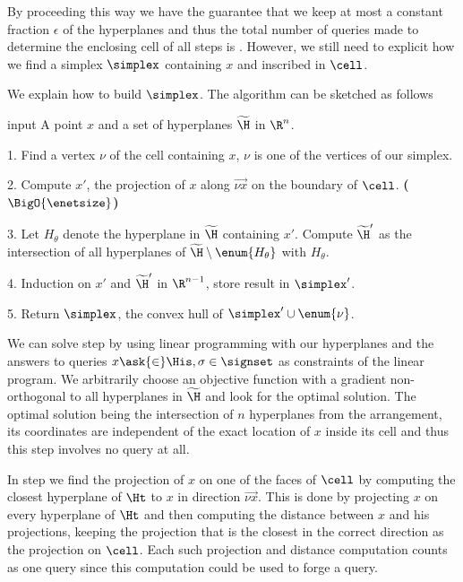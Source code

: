 By proceeding this way we have the guarantee that we keep at most a
constant fraction \(\epsilon\) of the hyperplanes and thus the total number of
queries made to determine the enclosing cell of
all steps is . However, we
still need to explicit how we find a simplex $\simplex$ containing $x$ and
inscribed in $\cell$.

We explain how to build $\simplex$. The algorithm can be sketched as
follows
\begin{algorithm}
\item[input] A point \(x\) and a set of hyperplanes \(\widetilde{\H}\) in
\(\R^n\).
\item[1.] Find a vertex $\nu$ of the cell containing $x$, $\nu$ is one of
the vertices of our simplex.
\item[2.] Compute $x'$, the projection of $x$ along $\vec{\nu x}$ on the
boundary of \(\cell\). \textbf{($\BigO{\enetsize}$)}
\item[3.] Let \(H_{\theta}\) denote the hyperplane in \(\widetilde{\H}\)
containing \(x'\). Compute \(\widetilde{\H}'\) as the intersection of all
hyperplanes of \(\widetilde{\H} \setminus \enum{H_{\theta}}\) with
\(H_{\theta}\).
\item[4.] Induction on \(x'\) and \(\widetilde{\H}'\) in $\R^{n-1}$, store result in \(\simplex'\).
\item[5.] Return \(\simplex\), the convex hull of \(\simplex' \cup \enum{\nu}\).
\end{algorithm}

We can solve step  by using linear programming with our  hyperplanes and the answers to queries $x \ask{\in} \His, \sigma \in
\signset$ as constraints of the linear program. We arbitrarily choose an
objective function with a gradient non-orthogonal to all hyperplanes in
\(\widetilde{\H}\) and look for
the optimal solution. The optimal solution being the intersection of \(n\)
hyperplanes from the arrangement, its coordinates are independent of the exact
location of \(x\) inside its cell and thus this step involves no query at all.

In step  we find the projection of $x$ on one of the faces of
$\cell$ by computing the closest hyperplane of $\Ht$ to $x$ in direction
$\vec{\nu x}$. This is done by projecting $x$ on every hyperplane of $\Ht$ and
then computing the distance between $x$ and his projections, keeping the
projection that is the closest in the correct direction as the projection
on $\cell$. Each such projection and distance computation counts as one query
since this computation could be used to forge a query.


